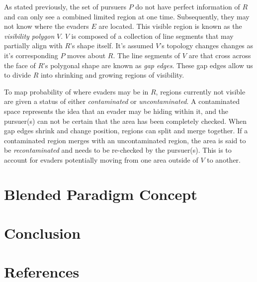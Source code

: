 \documentclass{article}
\begin{document}
As stated previously, the set of pursuers \(P\) do not have perfect information of \(R\) and can only see a combined limited region at one time. Subsequently, they may not know where the evaders \(E\) are located. This visible region is known as the \emph{visibility polygon} \(V\). \(V\) is composed of a collection of line segments that may partially align with \(R\)'s shape itself. It's assumed \(V\)'s topology changes changes as it's corresponding \(P\) moves about \(R\). The line segments of \(V\) are that cross across the face of \(R\)'s polygonal shape are known as \emph{gap edges}. These gap edges allow us to divide \(R\) into shrinking and growing regions of visibility. \cite{limVis, robotics}

To map probability of where evaders may be in \(R\), regions currently not visible are given a status of either \emph{contaminated} or \emph{uncontaminated}. A contaminated space represents the idea that an evader may be hiding within it, and the pursuer(s) can not be certain that the area has been completely checked. When gap edges shrink and change position, regions can split and merge together. If a contaminated region merges with an uncontaminated region, the area is said to be \emph{recontaminated} and needs to be re-checked by the pursuer(s). This is to account for evaders potentially moving from one area outside of \(V\) to another.

\section{Blended Paradigm Concept}

\section{Conclusion}

\section{References}
\end{document}
